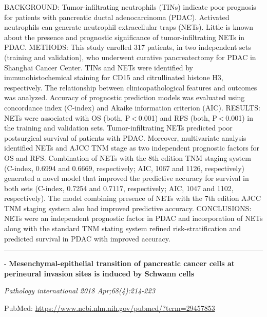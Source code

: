 \documentclass[]{article}
\begin{document}
BACKGROUND: Tumor-infiltrating neutrophils (TINs) indicate poor
prognosis for patients with pancreatic ductal adenocarcinoma (PDAC).
Activated neutrophils can generate neutrophil extracellular traps
(NETs). Little is known about the presence and prognostic significance
of tumor-infiltrating NETs in PDAC. METHODS: This study enrolled 317
patients, in two independent sets (training and validation), who
underwent curative pancreatectomy for PDAC in Shanghai Cancer Center.
TINs and NETs were identified by immunohistochemical staining for CD15
and citrullinated histone H3, respectively. The relationship between
clinicopathological features and outcomes was analyzed. Accuracy of
prognostic prediction models was evaluated using concordance index
(C-index) and Akaike information criterion (AIC). RESULTS: NETs were
associated with OS (both, P \textless{} 0.001) and RFS (both,
P \textless{} 0.001) in the training and validation sets.
Tumor-infiltrating NETs predicted poor postsurgical survival of patients
with PDAC. Moreover, multivariate analysis identified NETs and AJCC TNM
stage as two independent prognostic factors for OS and RFS. Combination
of NETs with the 8th edition TNM staging system (C-index, 0.6994 and
0.6669, respectively; AIC, 1067 and 1126, respectively) generated a
novel model that improved the predictive accuracy for survival in both
sets (C-index, 0.7254 and 0.7117, respectively; AIC, 1047 and 1102,
respectively). The model combining presence of NETs with the 7th edition
AJCC TNM staging system also had improved predictive accuracy.
CONCLUSIONS: NETs were an independent prognostic factor in PDAC and
incorporation of NETs along with the standard TNM stating system refined
risk-stratification and predicted survival in PDAC with improved
accuracy.

{}

{}

\begin{center}\rule{0.5\linewidth}{\linethickness}\end{center}

 - \textbf{Mesenchymal-epithelial transition of pancreatic cancer cells
at perineural invasion sites is induced by Schwann cells}

\emph{Pathology international 2018 Apr;68(4):214-223}

PubMed: \url{https://www.ncbi.nlm.nih.gov/pubmed/?term=29457853}
\end{document}
